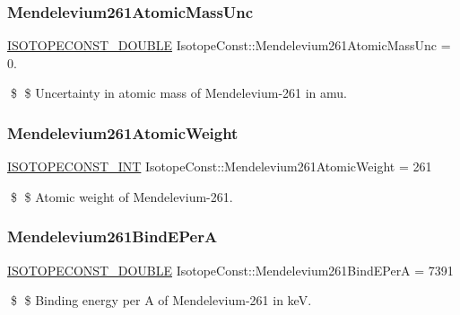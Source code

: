 \subsubsection{\texorpdfstring{Mendelevium261\+Atomic\+Mass\+Unc}{Mendelevium261AtomicMassUnc}}
{\footnotesize\ttfamily \mbox{\hyperlink{group___isotope_const-_macros_ga8f45a7272ce02c0b4c65c44636ed719a}{I\+S\+O\+T\+O\+P\+E\+C\+O\+N\+S\+T\+\_\+\+D\+O\+U\+B\+LE}} Isotope\+Const\+::\+Mendelevium261\+Atomic\+Mass\+Unc = 0.}

\$ \$ Uncertainty in atomic mass of Mendelevium-\/261 in amu. \mbox{\label{group___isotope_const-_mendelevium-_md261_gaf86bbd4cf7fc04ed773f25f65ffe217b}} 
\subsubsection{\texorpdfstring{Mendelevium261\+Atomic\+Weight}{Mendelevium261AtomicWeight}}
{\footnotesize\ttfamily \mbox{\hyperlink{group___isotope_const-_macros_ga5f18360b3e99483a35c32d789e62621c}{I\+S\+O\+T\+O\+P\+E\+C\+O\+N\+S\+T\+\_\+\+I\+NT}} Isotope\+Const\+::\+Mendelevium261\+Atomic\+Weight = 261}

\$ \$ Atomic weight of Mendelevium-\/261. \mbox{\label{group___isotope_const-_mendelevium-_md261_ga143b7d7e010f2ec7c9f23aeddc0dbcd6}} 
\subsubsection{\texorpdfstring{Mendelevium261\+Bind\+E\+PerA}{Mendelevium261BindEPerA}}
{\footnotesize\ttfamily \mbox{\hyperlink{group___isotope_const-_macros_ga8f45a7272ce02c0b4c65c44636ed719a}{I\+S\+O\+T\+O\+P\+E\+C\+O\+N\+S\+T\+\_\+\+D\+O\+U\+B\+LE}} Isotope\+Const\+::\+Mendelevium261\+Bind\+E\+PerA = 7391}

\$ \$ Binding energy per A of Mendelevium-\/261 in keV. \mbox{\label{group___isotope_const-_mendelevium-_md261_ga8925252469d750f1442107c10f1cb6b6}} 
